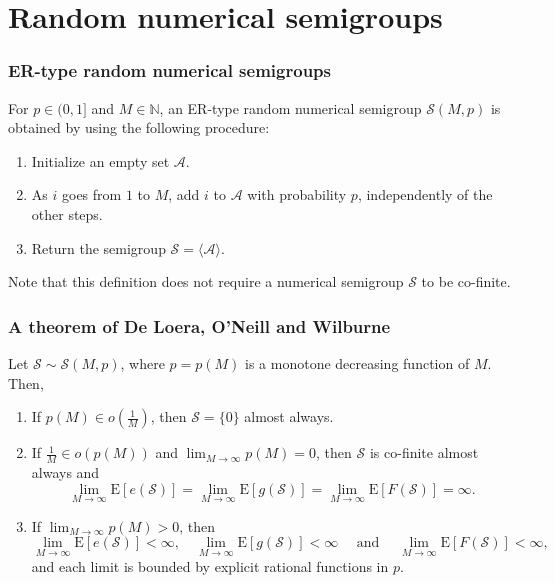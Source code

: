 \documentclass{beamer}
\def\NN{\ensuremath{\mathbb{N}}}
\def\EE{\ensuremath{\mathrm{E}}}
\begin{document}
\section{Random numerical semigroups}

\begin{frame}
    \frametitle{ER-type random numerical semigroups}
    \begin{definition}\label{def:randnumsems:ermodel}
        For $p \in (0, 1]$ and $M \in \NN$, an ER-type random numerical semigroup $\mathcal{S}(M, p)$ is obtained by using the following procedure:
        \begin{enumerate}
            \item Initialize an empty set $\mathcal{A}$.
            \item As $i$ goes from $1$ to $M$, add $i$ to $\mathcal{A}$ with probability $p$, independently of the other steps.
            \item Return the semigroup $\mathcal{S} = \langle\mathcal{A}\rangle$.
        \end{enumerate}
    \end{definition}
    Note that this definition does not require a numerical semigroup $\mathcal{S}$ to be co-finite.
\end{frame}

\begin{frame}
    \frametitle{A theorem of De Loera, O'Neill and Wilburne}

    \fontsize{10pt}{7.2}\selectfont

\begin{theorem}\label{thm:ermodel} Let $\mathcal{S} \sim \mathcal{S}(M, p)$, where $p = p(M)$ is a monotone decreasing function of $M$. Then, 
    \begin{enumerate}
        \item If $p(M) \in o\left(\frac{1}{M}\right)$, then $\mathcal{S} = \{0\}$ almost always.
        \item If $\frac{1}{M} \in o(p(M))$ and $\lim_{M \to \infty} p(M)= 0$, then $\mathcal{S}$ is co-finite almost always and
         \[\lim_{M \to  \infty} \EE[e(\mathcal{S})] = \lim_{M \to \infty} \EE[g(\mathcal{S})] = \lim_{M \to \infty} \EE[F(\mathcal{S})] = \infty.\]
        \item If $\lim_{M \to \infty} p(M) > 0$, then
        \[\lim_{M \to \infty} \EE[e(\mathcal{S})] < \infty,  \quad \lim_{M \to \infty} \EE[g(\mathcal{S})] < \infty \quad  \text{ and } \quad \lim_{M \to \infty} \EE[F(\mathcal{S})]< \infty,\]
        and each limit is bounded by explicit rational functions in $p$.
    \end{enumerate}
\end{theorem}
\end{frame}
\end{document}
